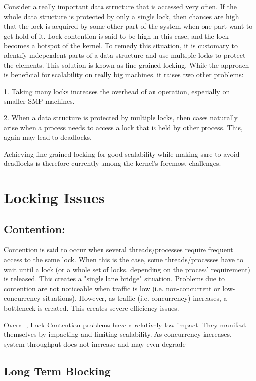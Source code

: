 \documentclass[a4paper]{article}
\begin{document}
Consider a really important data structure that is accessed very often. If the whole data structure is protected by only a single lock, then chances are high that the lock is acquired by some other part of the system when one part want to get hold of it. Lock contention is said to be high in this case, and the lock becomes a hotspot of the kernel. To remedy this situation, it is customary to identify independent parts of a data structure and use multiple locks to protect the elements. This solution is known as fine-grained locking. While the approach is beneficial for scalability on really big machines, it
raises two other problems:

1. Taking many locks increases the overhead of an operation, especially on smaller SMP
machines.

2. When a data structure is protected by multiple locks, then cases naturally arise when a process needs to access a lock that is held by other process. This, again may lead to deadlocks.

Achieving fine-grained locking for good scalability while making sure to avoid deadlocks is therefore
currently among the kernel’s foremost challenges.

\section{Locking Issues }

\subsection{Contention:}

Contention is said to occur when several threads/processes require frequent access to the same lock. When this is the case, some threads/processes have to wait until a lock (or a whole set of locks, depending on the process' requirement) is released. This creates a "single lane bridge" situation. Problems due to contention are not noticeable when traffic is low (i.e. non-concurrent or low-concurrency situations). However, as traffic (i.e. concurrency) increases, a bottleneck is created. This creates severe efficiency issues.

Overall, Lock Contention problems have a relatively low impact. They manifest themselves by impacting and limiting scalability. As concurrency increases, system throughput does not increase and may even degrade 

\subsection{Long Term Blocking}
\end{document}
